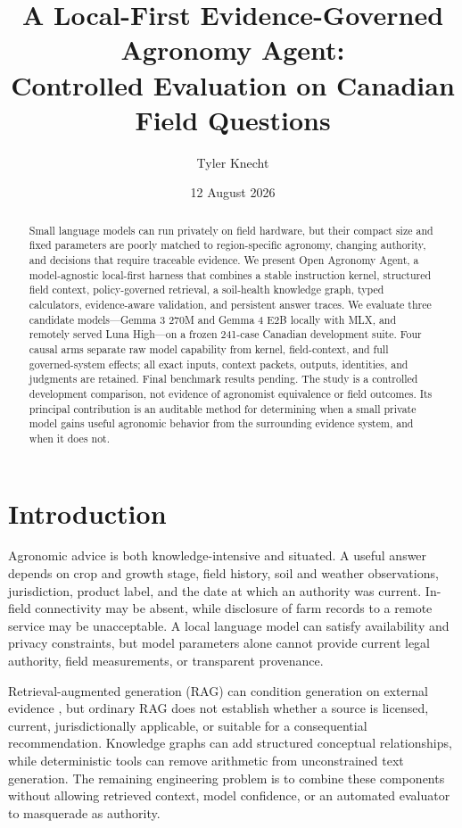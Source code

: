 \documentclass[9pt,twocolumn]{article}
\title{A Local-First Evidence-Governed Agronomy Agent:\\Controlled Evaluation on Canadian Field Questions}
\author{Tyler Knecht}
\date{12 August 2026}
\newcommand{\system}{Open Agronomy Agent}
\newcommand{\ResultAbstract}{Final benchmark results pending.}
\begin{document}
\raggedbottom
\maketitle

\begin{abstract}
Small language models can run privately on field hardware, but their compact size and fixed parameters are poorly matched to region-specific agronomy, changing authority, and decisions that require traceable evidence. We present \system{}, a model-agnostic local-first harness that combines a stable instruction kernel, structured field context, policy-governed retrieval, a soil-health knowledge graph, typed calculators, evidence-aware validation, and persistent answer traces. We evaluate three candidate models---Gemma 3 270M and Gemma 4 E2B locally with MLX, and remotely served Luna High---on a frozen 241-case Canadian development suite. Four causal arms separate raw model capability from kernel, field-context, and full governed-system effects; all exact inputs, context packets, outputs, identities, and judgments are retained. \ResultAbstract{} The study is a controlled development comparison, not evidence of agronomist equivalence or field outcomes. Its principal contribution is an auditable method for determining when a small private model gains useful agronomic behavior from the surrounding evidence system, and when it does not.
\end{abstract}

\section{Introduction}

Agronomic advice is both knowledge-intensive and situated. A useful answer depends on crop and growth stage, field history, soil and weather observations, jurisdiction, product label, and the date at which an authority was current. In-field connectivity may be absent, while disclosure of farm records to a remote service may be unacceptable. A local language model can satisfy availability and privacy constraints, but model parameters alone cannot provide current legal authority, field measurements, or transparent provenance.

Retrieval-augmented generation (RAG) can condition generation on external evidence \citep{lewis2020rag}, but ordinary RAG does not establish whether a source is licensed, current, jurisdictionally applicable, or suitable for a consequential recommendation. Knowledge graphs can add structured conceptual relationships, while deterministic tools can remove arithmetic from unconstrained text generation. The remaining engineering problem is to combine these components without allowing retrieved context, model confidence, or an automated evaluator to masquerade as authority.
\end{document}
